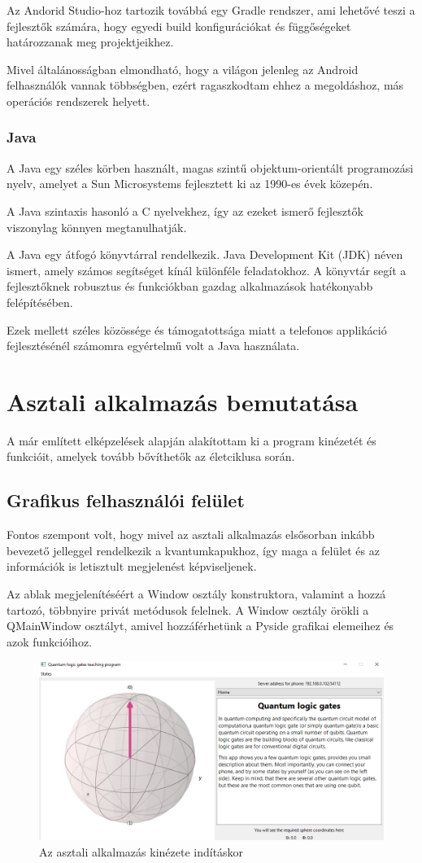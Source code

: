 \documentclass[
]{thesis-ekf}
\theoremstyle{definition}
\theoremstyle{remark}
\begin{document}
Az Andorid Studio-hoz tartozik továbbá egy Gradle rendszer, ami lehetővé teszi a fejlesztők számára, hogy egyedi build konfigurációkat és függőségeket határozzanak meg projektjeikhez.

Mivel általánosságban elmondható, hogy a világon jelenleg az Android felhasználók vannak többségben, ezért ragaszkodtam ehhez a megoldáshoz, más operációs rendszerek helyett.

\subsubsection{Java}
A Java egy széles körben használt, magas szintű objektum-orientált programozási nyelv, amelyet a Sun Microsystems fejlesztett ki az 1990-es évek közepén. 

A Java szintaxis hasonló a C nyelvekhez, így az ezeket ismerő fejlesztők viszonylag könnyen megtanulhatják. 

A Java egy átfogó könyvtárral rendelkezik. Java Development Kit (JDK) néven ismert, amely számos segítséget kínál különféle feladatokhoz. A könyvtár segít a fejlesztőknek robusztus és funkciókban gazdag alkalmazások hatékonyabb felépítésében.\cite{Java}

Ezek mellett széles közössége és támogatottsága miatt a telefonos applikáció fejlesztésénél számomra egyértelmű volt a Java használata.

\section{Asztali alkalmazás bemutatása}
A már említett elképzelések alapján alakítottam ki a program kinézetét és funkcióit, amelyek tovább bővíthetők az életciklusa során.

\subsection{Grafikus felhasználói felület}
Fontos szempont volt, hogy mivel az asztali alkalmazás elsősorban inkább bevezető jelleggel rendelkezik a kvantumkapukhoz, így maga a felület és az információk  is letisztult megjelenést képviseljenek.

Az ablak megjelenítéséért a Window osztály konstruktora, valamint a hozzá tartozó, többnyire privát metódusok felelnek. A Window osztály örökli a QMainWindow osztályt, amivel hozzáférhetünk a Pyside grafikai elemeihez és azok funkcióihoz.

\begin{figure}[H]
	\centering
	\includegraphics[width=0.6\linewidth]{Program}
	\caption{Az asztali alkalmazás kinézete indításkor}
	\label{fig:program}
\end{figure}
\end{document}
